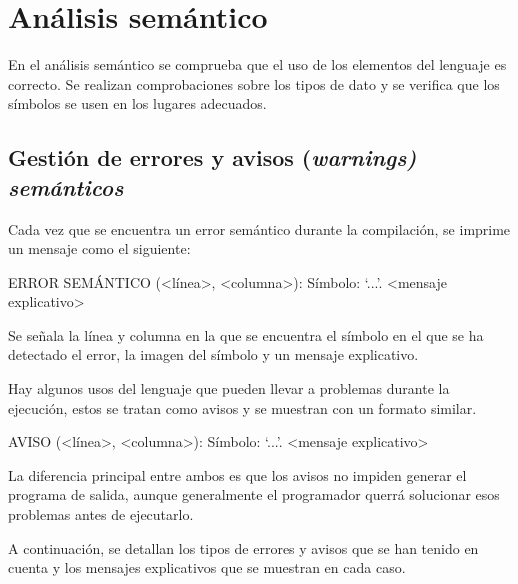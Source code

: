 \section{Análisis semántico}
En el análisis semántico se comprueba que el uso de los elementos del lenguaje es correcto. Se realizan comprobaciones sobre los tipos de dato y se verifica que los símbolos se usen en los lugares adecuados.

\subsection{Gestión de errores y avisos (\it{warnings}) semánticos}
Cada vez que se encuentra un error semántico durante la compilación, se imprime un mensaje como el siguiente:

\begin{codigo}
ERROR SEMÁNTICO (<línea>, <columna>): Símbolo: `...'. <mensaje explicativo>
\end{codigo}

Se señala la línea y columna en la que se encuentra el símbolo en el que se ha detectado el error, la imagen del símbolo y un mensaje explicativo.

Hay algunos usos del lenguaje que pueden llevar a problemas durante la ejecución, estos se tratan como avisos y se muestran con un formato similar.

\begin{codigo}
AVISO (<línea>, <columna>): Símbolo: `...'. <mensaje explicativo>
\end{codigo}

La diferencia principal entre ambos es que los avisos no impiden generar el programa de salida, aunque generalmente el programador querrá solucionar esos problemas antes de ejecutarlo.

A continuación, se detallan los tipos de errores y avisos que se han tenido en cuenta y los mensajes explicativos que se muestran en cada caso.

